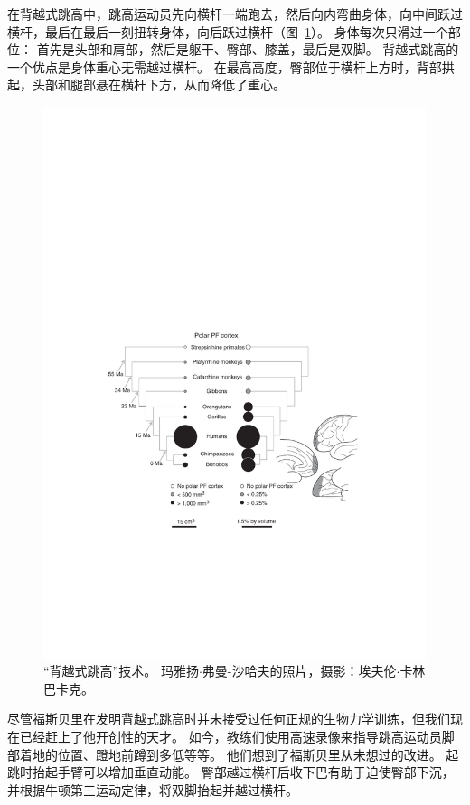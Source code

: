 在背越式跳高中，跳高运动员先向横杆一端跑去，然后向内弯曲身体，向中间跃过横杆，最后在最后一刻扭转身体，向后跃过横杆（图~\ref{fig:9_1}）。
身体每次只滑过一个部位：
首先是头部和肩部，然后是躯干、臀部、膝盖，最后是双脚。
背越式跳高的一个优点是身体重心无需越过横杆。
在最高高度，臀部位于横杆上方时，背部拱起，头部和腿部悬在横杆下方，从而降低了重心。


\begin{figure}[!htb]
	\centering
	\includegraphics[width=1.0\linewidth]{chap9/9_1}
	\caption{“背越式跳高”技术。
		玛雅扬$\cdot$弗曼-沙哈夫的照片，摄影：埃夫伦$\cdot$卡林巴卡克。 \label{fig:9_1}}
\end{figure}


尽管福斯贝里在发明背越式跳高时并未接受过任何正规的生物力学训练，但我们现在已经赶上了他开创性的天才。
如今，教练们使用高速录像来指导跳高运动员脚部着地的位置、蹬地前蹲到多低等等。
他们想到了福斯贝里从未想过的改进。
起跳时抬起手臂可以增加垂直动能。
臀部越过横杆后收下巴有助于迫使臀部下沉，并根据牛顿第三运动定律，将双脚抬起并越过横杆。


